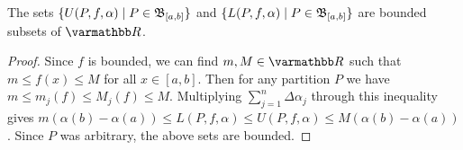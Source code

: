     \iffalse
    Since $f$ is defined on all of $[a,b]$, it is not necessary that we define $M_j(f)$ strictly between the partition which it was defined. It is sufficient to consider the closed set $[x_{j-1},x_j]$.
    \fi

    \begin{proposition}
        The sets $\{U(P,f,\alpha) \mid P \in \mathfrak{B}_{[a,b]}\}$ and $\{L(P,f,\alpha) \mid P \in \mathfrak{B}_{[a,b]}\}$ are bounded subsets of $\bfR$.
    \end{proposition}
        \begin{proof}
            Since $f$ is bounded, we can find $m,M \in \bfR$ such that $m  \leq f(x) \leq M$ for all $x \in [a,b]$. Then for any partition $P$ we have $m \leq m_j(f) \leq M_j(f) \leq M$. Multiplying $\sum_{j = 1}^n\Delta \alpha_j$ through this inequality gives $m(\alpha(b) - \alpha(a)) \leq L(P,f,\alpha) \leq U(P,f,\alpha) \leq M(\alpha(b) - \alpha(a))$. Since $P$ was arbitrary, the above sets are bounded.
        \end{proof}

